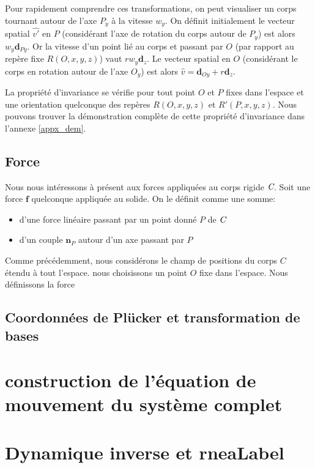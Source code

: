 \documentclass{report}
\begin{document}
Pour rapidement comprendre ces transformations, on peut visualiser un corps tournant autour de l'axe $P_{y}$ à la vitesse $w_{y}$. On définit initialement le vecteur spatial $\widehat{v'}$ en $P$ (\cad considérant l'axe de rotation du corps autour de $P_{y}$) est alors $w_{y}\textbf{d}_{Py}$. Or la vitesse d'un point lié au corps et passant par $O$ (par rapport au repère fixe $R(O,x,y,z)$) vaut $rw_{y}\textbf{d}_{z}$. Le vecteur spatial en $O$ (\cad considérant le corps en rotation autour de l'axe $O_{y}$) est alors $\widehat{v}=\textbf{d}_{Oy}+r\textbf{d}_{z}$.

La propriété d'invariance se vérifie pour tout point $O$ et $P$ fixes dans l'espace et une orientation quelconque des repères $R(O,x,y,z)$ et $R'(P,x,y,z)$. Nous pouvons trouver la démonstration complète de cette propriété d'invariance dans l'annexe \ref{appx_dem}.


\subsection{Force}

Nous nous intéressons à présent aux forces appliquées au corps rigide $\emph{C}$. Soit une force $\textbf{f}$ quelconque appliquée au solide. On le définit comme une somme:
\begin{itemize}
\item d'une force linéaire passant par un point donné $P$ de $\emph{C}$
\item d'un couple $\textbf{n}_{P}$ autour d'un axe passant par $P$
\end{itemize}

Comme précédemment, nous considérons le champ de positions du corps $C$ étendu à tout l'espace. nous choisissons un point $O$ fixe dans l'espace. Nous définissons la force 

\subsection{Coordonnées de Plücker et transformation de bases}


\section{construction de l'équation de mouvement du système complet}

\section{Dynamique inverse et \gls{rneaLabel}}
\end{document}
